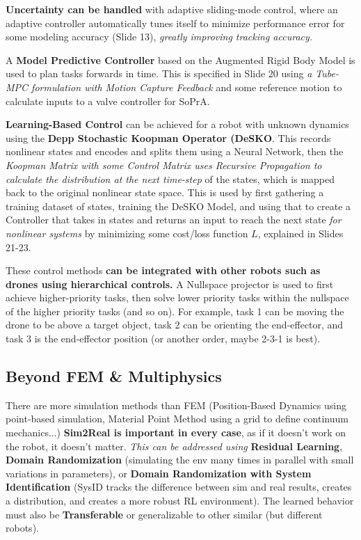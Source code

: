 \documentclass[onecolumn,a4paper]{article}
\begin{document}
\textbf{Uncertainty can be handled} with adaptive sliding-mode control, where an adaptive controller automatically tunes itself to minimize performance error for some modeling accuracy (Slide 13), \emph{greatly improving tracking accuracy.}

A \textbf{Model Predictive Controller} based on the Augmented Rigid Body Model is used to plan tasks forwards in time. This is specified in Slide 20 using \emph{a Tube-MPC formulation with Motion Capture Feedback} and some reference motion to calculate inputs to a valve controller for SoPrA.

\textbf{Learning-Based Control} can be achieved for a robot with unknown dynamics using the \textbf{Depp Stochastic Koopman Operator (DeSKO}. This records nonlinear states and encodes and splits them using a Neural Network, then the \emph{Koopman Matrix with some Control Matrix uses Recursive Propagation to calculate the distribution at the next time-step} of the states, which is mapped back to the original nonlinear state space. This is used by first gathering a training dataset of states, training the DeSKO Model, and using that to create a Controller that takes in states and returns an input to reach the next state \emph{for nonlinear systems} by minimizing some cost/loss function $L$, explained in Slides 21-23.

These control methods \textbf{can be integrated with other robots such as drones using hierarchical controls.} A Nullspace projector is used to first achieve higher-priority tasks, then solve lower priority tasks within the nullspace of the higher priority tasks (and so on). For example, task 1 can be moving the drone to be above a target object, task 2 can be orienting the end-effector, and task 3 is the end-effector position (or another order, maybe 2-3-1 is best).

\subsection{Beyond FEM \& Multiphysics}

There are more simulation methods than FEM (Position-Based Dynamics using point-based simulation, Material Point Method using a grid to define continuum mechanics...) \textbf{Sim2Real is important in every case}, as if it doesn't work on the robot, it doesn't matter. \emph{This can be addressed using} \textbf{Residual Learning}, \textbf{Domain Randomization} (simulating the env many times in parallel with small variations in parameters), or \textbf{Domain Randomization with System Identification} (SysID tracks the difference between sim and real results, creates a distribution, and creates a more robust RL environment). The learned behavior must also be \textbf{Transferable} or generalizable to other similar (but different robots).
\end{document}
